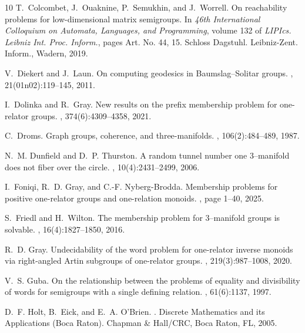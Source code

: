 \documentclass[11pt]{amsart}
\theoremstyle{plain}
\theoremstyle{definition}
\begin{document}
\begin{thebibliography}{10}
T.~Colcombet, J.~Ouaknine, P.~Semukhin, and J.~Worrell.
\newblock On reachability problems for low-dimensional matrix semigroups.
\newblock In {\em 46th {I}nternational {C}olloquium on {A}utomata, {L}anguages,
  and {P}rogramming}, volume 132 of {\em LIPIcs. Leibniz Int. Proc. Inform.},
  pages Art. No. 44, 15. Schloss Dagstuhl. Leibniz-Zent. Inform., Wadern, 2019.

V.~Diekert and J.~Laun.
\newblock On computing geodesics in {B}aumslag--{S}olitar groups.
, 21(01n02):119--145, 2011.

I.~Dolinka and R.~Gray.
\newblock New results on the prefix membership problem for one-relator groups.
, 374(6):4309--4358, 2021.

C.~Droms.
\newblock Graph groups, coherence, and three-manifolds.
, 106(2):484--489, 1987.

N.~M. Dunfield and D.~P. Thurston.
\newblock A random tunnel number one 3--manifold does not fiber over the
  circle.
, 10(4):2431--2499, 2006.

I.~Foniqi, R.~D. Gray, and C.-F. Nyberg-Brodda.
\newblock Membership problems for positive one-relator groups and one-relation
  monoids.
, page 1–40, 2025.

S.~Friedl and H.~Wilton.
\newblock The membership problem for 3--manifold groups is solvable.
, 16(4):1827--1850, 2016.

R.~D. Gray.
\newblock Undecidability of the word problem for one-relator inverse monoids
  via right-angled {A}rtin subgroups of one-relator groups.
, 219(3):987--1008, 2020.

V.~S. Guba.
\newblock On the relationship between the problems of equality and divisibility
  of words for semigroups with a single defining relation.
, 61(6):1137, 1997.

D.~F. Holt, B.~Eick, and E.~A. O'Brien.
.
\newblock Discrete Mathematics and its Applications (Boca Raton). Chapman \&
  Hall/CRC, Boca Raton, FL, 2005.


\end{thebibliography}
\end{document}
